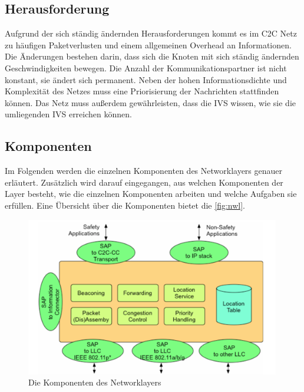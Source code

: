 \subsection{Herausforderung}
Aufgrund der sich ständig ändernden Herausforderungen kommt es im \ac{C2C} Netz zu häufigen Paketverlusten und einem allgemeinen Overhead an Informationen. Die Änderungen bestehen darin, dass sich die Knoten mit sich ständig ändernden Geschwindigkeiten bewegen. Die Anzahl der Kommunikationspartner ist nicht konstant, sie ändert sich permanent. Neben der hohen Informationsdichte und Komplexität des Netzes muss eine Priorisierung der Nachrichten stattfinden können. Das Netz muss außerdem gewährleisten, dass die \ac{IVS} wissen, wie sie die umliegenden \ac{IVS} erreichen können.

\subsection{Komponenten}
Im Folgenden werden die einzelnen Komponenten des Networklayers genauer erläutert. Zusätzlich wird darauf eingegangen, aus welchen Komponenten der Layer besteht, wie die einzelnen Komponenten arbeiten und welche Aufgaben sie erfüllen. Eine Übersicht über die Komponenten bietet die \autoref{fig:nwl}. 

\begin{figure}
	\includegraphics[width=0.99\textwidth]{content/images/03_networklayer/networklayer.png}
	\caption{Die Komponenten des Networklayers \cite{C2C-manifesto}}
	\label{fig:nwl}
\end{figure}

